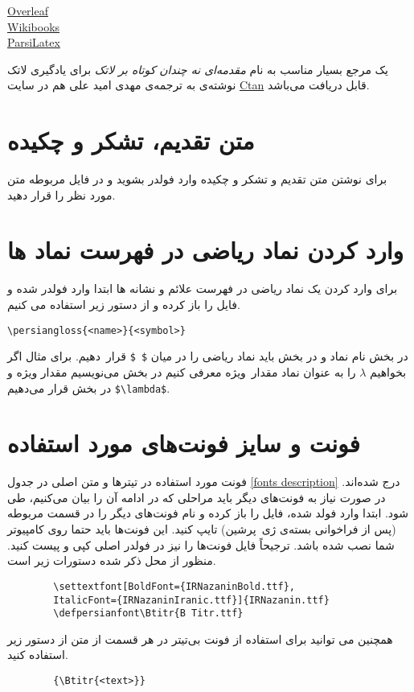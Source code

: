 \begin{latin}
	\noindent
	\href{https://www.overleaf.com/learn}{Overleaf}\\
    \href{https://en.wikibooks.org/wiki/LaTeX}{Wikibooks}\\
	\href{http://parsilatex.com}{ParsiLatex}
\end{latin}
یک مرجع بسیار مناسب به نام 
\textit{مقدمه‌ای نه چندان کوتاه بر لاتک}
برای یادگیری لاتک نوشته‌ی 
\linebreak
{} 
به ترجمه‌ی مهدی امید علی هم در سایت 
 \href{https://www.ctan.org/tex-archive/info/lshort/persian}{Ctan}
 قابل دریافت می‌باشد. 





\section{متن تقدیم، تشکر و چکیده}
برای نوشتن متن تقدیم و تشکر و چکیده وارد فولدر 
بشوید و در فایل مربوطه متن مورد نظر را قرار دهید. 

\section{وارد کردن نماد ریاضی در فهرست  نماد ها}
برای وارد کردن یک نماد ریاضی در فهرست علائم و نشانه ها ابتدا وارد فولدر 
شده و فایل 
را باز کرده و از دستور زیر استفاده می کنیم. 
\begin{latin}
	\noindent
	\verb*|\persiangloss{<name>}{<symbol>}|
\end{latin}
در بخش 
نام نماد و در بخش 
باید نماد ریاضی را در میان 
\verb|$ $| 
قرار‍~دهیم. برای مثال اگر بخواهیم 
$\lambda$ 
را به عنوان نماد مقدار~ویژه معرفی کنیم در بخش 
می‌نویسیم مقدار ویژه و در بخش 
قرار می‌دهیم
\verb|$\lambda$|.

\section{فونت و سایز فونت‌های مورد استفاده}
فونت مورد استفاده در تیتر‌ها و متن اصلی در جدول 
\ref{fonts description} 
درج شده‌اند. در صورت نیاز به فونت‌های دیگر باید مراحلی که در ادامه آن را بیان می‌کنیم، طی شود. ابتدا وارد فولد 
شده، فایل 
را باز کرده و نام فونت‌های دیگر را در قسمت مربوطه (پس از فراخوانی بسته‌ی ژی~پرشین) تایپ کنید. این فونت‌ها باید حتما روی کامپیوتر شما نصب شده باشد. ترجیحاً فایل 
فونت‌ها را نیز در فولدر اصلی کپی و پیست کنید. منظور از محل ذکر شده دستورات زیر است. 
\begin{latin} 
	\begin{verbatim}
		\settextfont[BoldFont={IRNazaninBold.ttf},
		ItalicFont={IRNazaninIranic.ttf}]{IRNazanin.ttf}
		\defpersianfont\Btitr{B Titr.ttf}
	\end{verbatim}
\end{latin} 
همچنین می توانید برای استفاده از فونت بی‌تیتر در هر قسمت از متن از دستور زیر استفاده کنید. 
\begin{latin}
	\begin{verbatim}
		{\Btitr{<text>}}
	\end{verbatim}
\end{latin}
 
